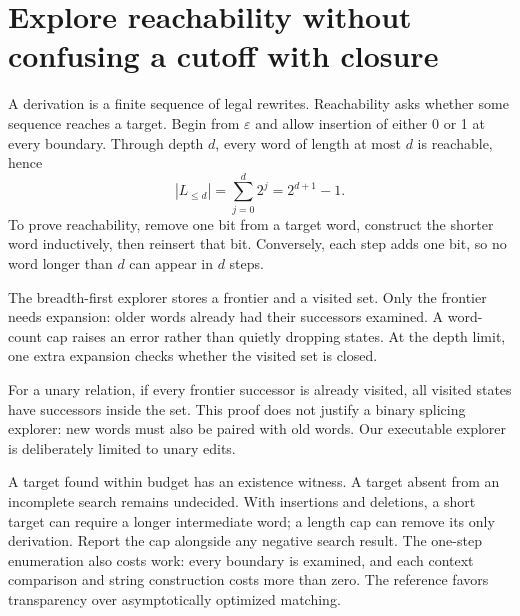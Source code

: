 \section{Explore reachability without confusing a cutoff with closure}
A derivation is a finite sequence of legal rewrites. Reachability asks whether
some sequence reaches a target. Begin from $\varepsilon$ and allow insertion
of either 0 or 1 at every boundary. Through depth $d$, every word of length at
most $d$ is reachable, hence
\begin{equation}
 |L_{\leq d}|=\sum_{j=0}^{d}2^j=2^{d+1}-1.
 \label{eq:growth}
\end{equation}
To prove reachability, remove one bit from a target word, construct the shorter
word inductively, then reinsert that bit. Conversely, each step adds one bit,
so no word longer than $d$ can appear in $d$ steps.

The breadth-first explorer stores a frontier and a visited set. Only the
frontier needs expansion: older words already had their successors examined.
A word-count cap raises an error rather than quietly dropping states.
At the depth limit, one extra expansion checks whether the visited set is closed.
\begin{center}\end{center}

For a unary relation, if every frontier successor is already visited, all
visited states have successors inside the set. This proof does not justify
a binary splicing explorer: new words must also be paired with old words.
Our executable explorer is deliberately limited to unary edits.

A target found within budget has an existence witness. A target absent
from an incomplete search remains undecided. With insertions and deletions,
a short target can require a longer intermediate word; a length cap can remove
its only derivation. Report the cap alongside any negative search result.
The one-step enumeration also costs work: every boundary is examined,
and each context comparison and string construction costs more than zero.
The reference favors transparency over asymptotically optimized matching.

